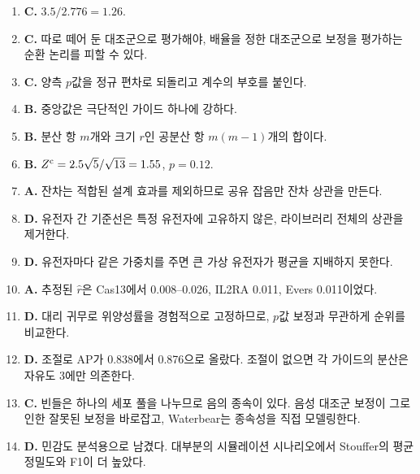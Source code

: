 \documentclass[11pt]{article}
\begin{document}
\begin{enumerate}[label=\textbf{Q\arabic*.},leftmargin=2.6em,itemsep=5pt]
\item \textbf{C.} $3.5/2.776=1.26$.
\item \textbf{C.} 따로 떼어 둔 대조군으로 평가해야, 배율을 정한 대조군으로
보정을 평가하는 순환 논리를 피할 수 있다.
\item \textbf{C.} 양측 $p$값을 정규 편차로 되돌리고 계수의 부호를 붙인다.
\item \textbf{B.} 중앙값은 극단적인 가이드 하나에 강하다.
\item \textbf{B.} 분산 항 $m$개와 크기 $r$인 공분산 항 $m(m-1)$개의 합이다.
\item \textbf{B.} $Z^{\text c}=2.5\sqrt5/\sqrt{13}=1.55$, $p=0.12$.
\item \textbf{A.} 잔차는 적합된 설계 효과를 제외하므로 공유 잡음만 잔차 상관을
만든다.
\item \textbf{D.} 유전자 간 기준선은 특정 유전자에 고유하지 않은, 라이브러리
전체의 상관을 제거한다.
\item \textbf{D.} 유전자마다 같은 가중치를 주면 큰 가상 유전자가 평균을 지배하지
못한다.
\item \textbf{A.} 추정된 $\hat r$은 Cas13에서 0.008--0.026, IL2RA 0.011,
Evers 0.011이었다.
\item \textbf{D.} 대리 귀무로 위양성률을 경험적으로 고정하므로, $p$값 보정과
무관하게 순위를 비교한다.
\item \textbf{D.} 조절로 AP가 0.838에서 0.876으로 올랐다. 조절이 없으면 각
가이드의 분산은 자유도 3에만 의존한다.
\item \textbf{C.} 빈들은 하나의 세포 풀을 나누므로 음의 종속이 있다. 음성 대조군
보정이 그로 인한 잘못된 보정을 바로잡고, Waterbear는 종속성을 직접 모델링한다.
\item \textbf{D.} 민감도 분석용으로 남겼다. 대부분의 시뮬레이션 시나리오에서
Stouffer의 평균정밀도와 F1이 더 높았다.
\end{enumerate}
\end{document}
